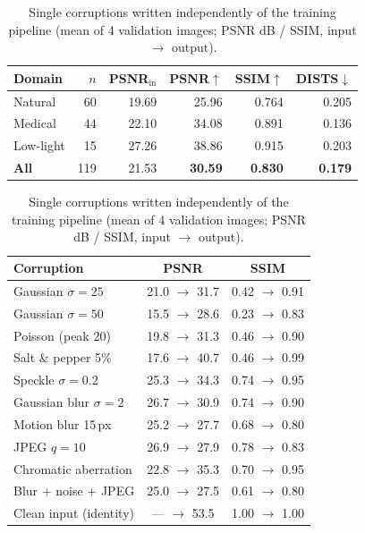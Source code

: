 \documentclass[10pt,a4paper]{article}
\begin{document}
\begin{table}[h]\centering\small
\begin{minipage}[t]{0.46\linewidth}\centering
\caption{Held-out validation set (final EMA weights).}
\begin{tabular}{lrrrrr}\toprule
Domain & $n$ & PSNR$_\text{in}$ & PSNR$\uparrow$ & SSIM$\uparrow$ & DISTS$\downarrow$\\\midrule
Natural & 60 & 19.69 & 25.96 & 0.764 & 0.205\\
Medical & 44 & 22.10 & 34.08 & 0.891 & 0.136\\
Low-light & 15 & 27.26 & 38.86 & 0.915 & 0.203\\\midrule
\textbf{All} & 119 & 21.53 & \textbf{30.59} & \textbf{0.830} & \textbf{0.179}\\\bottomrule
\end{tabular}

\end{minipage}\hfill
\begin{minipage}[t]{0.51\linewidth}\centering
\caption{Single corruptions written independently of the training pipeline (mean of 4 validation images; PSNR dB / SSIM, input $\rightarrow$ output).}
\begin{tabular}{lcc}\toprule
Corruption & PSNR & SSIM\\\midrule
Gaussian $\sigma{=}25$ & 21.0 $\rightarrow$ 31.7 & 0.42 $\rightarrow$ 0.91\\
Gaussian $\sigma{=}50$ & 15.5 $\rightarrow$ 28.6 & 0.23 $\rightarrow$ 0.83\\
Poisson (peak 20) & 19.8 $\rightarrow$ 31.3 & 0.46 $\rightarrow$ 0.90\\
Salt \& pepper 5\% & 17.6 $\rightarrow$ 40.7 & 0.46 $\rightarrow$ 0.99\\
Speckle $\sigma{=}0.2$ & 25.3 $\rightarrow$ 34.3 & 0.74 $\rightarrow$ 0.95\\
Gaussian blur $\sigma{=}2$ & 26.7 $\rightarrow$ 30.9 & 0.74 $\rightarrow$ 0.90\\
Motion blur 15\,px & 25.2 $\rightarrow$ 27.7 & 0.68 $\rightarrow$ 0.80\\
JPEG $q{=}10$ & 26.9 $\rightarrow$ 27.9 & 0.78 $\rightarrow$ 0.83\\
Chromatic aberration & 22.8 $\rightarrow$ 35.3 & 0.70 $\rightarrow$ 0.95\\
Blur + noise + JPEG & 25.0 $\rightarrow$ 27.5 & 0.61 $\rightarrow$ 0.80\\
Clean input (identity) & --- $\rightarrow$ 53.5 & 1.00 $\rightarrow$ 1.00\\\bottomrule
\end{tabular}
\end{minipage}
\end{table}
\end{document}
